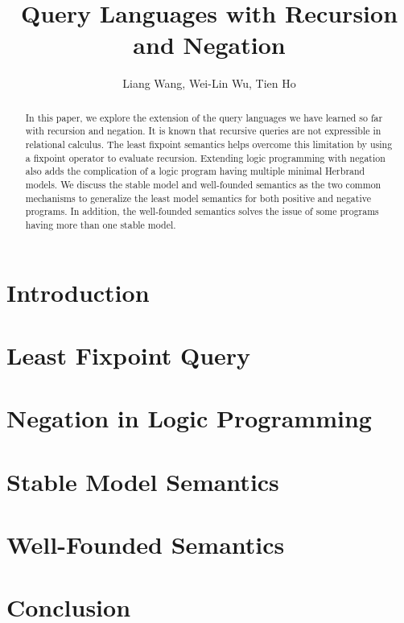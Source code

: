\documentclass[11pt]{article}
\begin{document}
\title{Query Languages with Recursion and Negation}
\author{Liang Wang, Wei-Lin Wu, Tien Ho}
\maketitle

\begin{abstract}
  In this paper, we explore the extension of the query languages we have 
  learned so far with recursion and negation. It is known that 
  recursive queries are not expressible in relational calculus. The least 
  fixpoint semantics helps overcome this limitation by using a fixpoint 
  operator to evaluate recursion. Extending logic programming with negation 
  also adds the complication of a logic program having multiple minimal 
  Herbrand models. We discuss the stable model and well-founded semantics 
  as the two common mechanisms to generalize the least model semantics 
  for both positive and negative programs. In addition, the well-founded semantics 
  solves the issue of some programs having more than one stable model.
\end{abstract}

\section{Introduction} 

\section{Least Fixpoint Query} 
\section{Negation in Logic Programming} 
\section{Stable Model Semantics} 
\section{Well-Founded Semantics} 
\section{Conclusion} 
\end{document}

